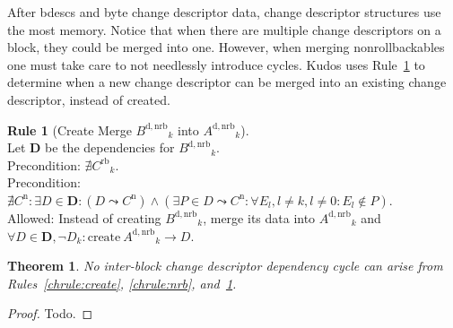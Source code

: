\documentclass{article}
\newtheorem{thm}{Theorem}[section]
\theoremstyle{definition}
\newtheorem{chrule}{Rule}[section]
\newcommand{\cd}[1]{\ensuremath{#1}}
\newcommand{\cdb}[2]{\ensuremath{\cd{#1}_#2}}
\newcommand{\ncd}[1]{\ensuremath{\cd{#1}^\mathrm{n}}}
\newcommand{\rb}[1]{\ensuremath{\cd{#1}^\mathrm{rb}}}
\newcommand{\dnrb}[1]{\ensuremath{\cd{#1}^\mathrm{d,nrb}}}
\newcommand{\depends}[2]{\ensuremath{#1\! \rightarrow\! #2}}
\newcommand{\indirdepends}[2]{\ensuremath{#1\! \leadsto\! #2}}
\newcommand{\cdset}[1]{\ensuremath{\mathbf{#1}}}
\begin{document}
After bdescs and byte change descriptor data, change descriptor structures
use the most memory. Notice that when there are multiple change descriptors
on a block, they could be merged into one. However, when merging
nonrollbackables one must take care to not needlessly introduce cycles.
Kudos uses Rule~\ref{chrule:merge} to determine when a new change descriptor
can be merged into an existing change descriptor, instead of created.

\begin{chrule}[Create Merge \cdb{\dnrb{B}}{k} into \cdb{\dnrb{A}}{k}]\label{chrule:merge}
  \mbox{}\\
  Let \cdset{D} be the dependencies for \cdb{\dnrb{B}}{k}.\\
  Precondition: \(\nexists \cdb{\rb{C}}{k}\).\\
  Precondition:
  \(\nexists \ncd{C}\!:
      \exists D\! \in\! \cdset{D}\!:
        (\indirdepends{\cd{D}}{\ncd{C}})
        \wedge
        (\exists P\! \in\! \indirdepends{\cd{D}}{\ncd{C}}\!:
          \forall \cdb{E}{l}, l \neq k, l \neq 0\!:
            \cdb{E}{l}\! \notin\! P)\).\\
  Allowed: Instead of creating \cdb{\dnrb{B}}{k},
  merge its data into \cdb{\dnrb{A}}{k} and
  \(\forall \cd{D}\! \in\! \cdset{D}, \neg \cdb{D}{k}\!:
    \mbox{create}\ \depends{\cdb{\dnrb{A}}{k}}{\cd{D}}\).
\end{chrule}

\begin{thm}\label{thm:mergesafe}
  No inter-block change descriptor dependency cycle can arise from
  Rules~\ref{chrule:create}, \ref{chrule:nrb}, and~\ref{chrule:merge}.
\end{thm}
\begin{proof}
Todo.
\end{proof}
\end{document}
